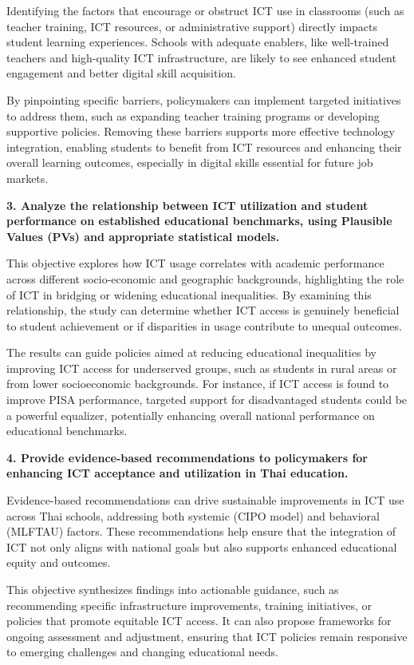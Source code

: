 \documentclass[
]{article}
\begin{document}
Identifying the factors that encourage or obstruct ICT use in classrooms
(such as teacher training, ICT resources, or administrative support)
directly impacts student learning experiences. Schools with adequate
enablers, like well-trained teachers and high-quality ICT
infrastructure, are likely to see enhanced student engagement and better
digital skill acquisition.

By pinpointing specific barriers, policymakers can implement targeted
initiatives to address them, such as expanding teacher training programs
or developing supportive policies. Removing these barriers supports more
effective technology integration, enabling students to benefit from ICT
resources and enhancing their overall learning outcomes, especially in
digital skills essential for future job markets.

\textbf{3. Analyze the relationship between ICT utilization and student
performance on established educational benchmarks, using Plausible
Values (PVs) and appropriate statistical models.}

This objective explores how ICT usage correlates with academic
performance across different socio-economic and geographic backgrounds,
highlighting the role of ICT in bridging or widening educational
inequalities. By examining this relationship, the study can determine
whether ICT access is genuinely beneficial to student achievement or if
disparities in usage contribute to unequal outcomes.

The results can guide policies aimed at reducing educational
inequalities by improving ICT access for underserved groups, such as
students in rural areas or from lower socioeconomic backgrounds. For
instance, if ICT access is found to improve PISA performance, targeted
support for disadvantaged students could be a powerful equalizer,
potentially enhancing overall national performance on educational
benchmarks.

\textbf{4. Provide evidence-based recommendations to policymakers for
enhancing ICT acceptance and utilization in Thai education.}

Evidence-based recommendations can drive sustainable improvements in ICT
use across Thai schools, addressing both systemic (CIPO model) and
behavioral (MLFTAU) factors. These recommendations help ensure that the
integration of ICT not only aligns with national goals but also supports
enhanced educational equity and outcomes.

This objective synthesizes findings into actionable guidance, such as
recommending specific infrastructure improvements, training initiatives,
or policies that promote equitable ICT access. It can also propose
frameworks for ongoing assessment and adjustment, ensuring that ICT
policies remain responsive to emerging challenges and changing
educational needs.
\end{document}

